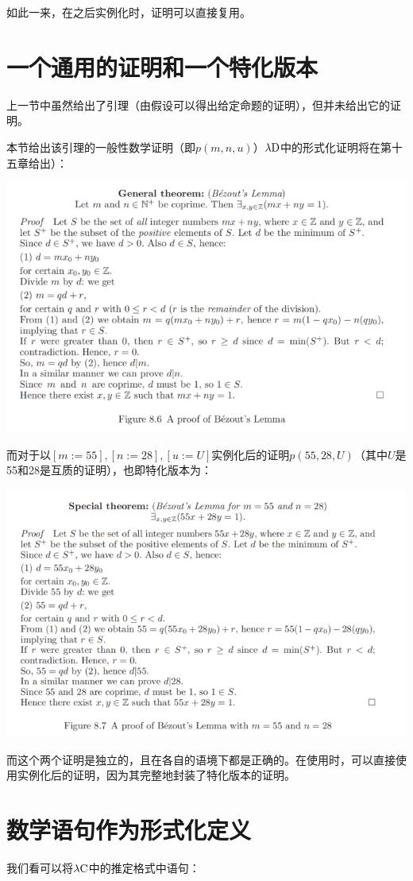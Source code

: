\documentclass[UTF8]{article}
\begin{document}
		如此一来，在之后实例化时，证明可以直接复用。
		
	\section{一个通用的证明和一个特化版本}
	\noindent
	上一节中虽然给出了引理（由假设可以得出给定命题的证明），但并未给出它的证明。
	
		本节给出该引理的一般性数学证明（即$p(m,n,u)$）$\lambda{\rm D}$中的形式化证明将在第十五章给出）：
		
		\noindent
		\includegraphics[width=0.93\linewidth]{"../imgs/8-4.png"}
		
		而对于以$[m:=55],[n:=28],[u:=U]$实例化后的证明$p(55,28,U)$（其中$U$是55和28是互质的证明），也即特化版本为：
		
		\noindent
		\includegraphics[width=0.93\linewidth]{"../imgs/8-5.png"}
		
		而这个两个证明是独立的，且在各自的语境下都是正确的。在使用时，可以直接使用实例化后的证明，因为其完整地封装了特化版本的证明。
		
	\section{数学语句作为形式化定义}
	\noindent
	我们看可以将$\lambda{\rm C}$中的推定格式中语句：
	
\end{document}
